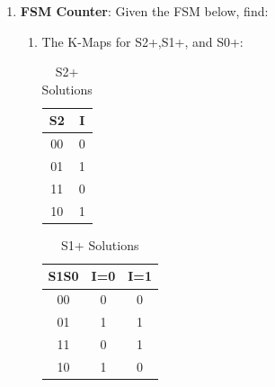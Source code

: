 \documentclass{article}
\begin{document}
\begin{enumerate}[label=(\alph*)]
\begin{multicols}{2}
        \end{multicols}
        \newpage
        \item \textbf{FSM Counter}: Given the FSM below, find:
        \begin{enumerate}[label=(\roman*),nolistsep]
            \item The K-Maps for S2+,S1+, and S0+:
            \newline
\begin{table}[h]
\centering
\begin{tabular}{|c|c|}
\hline
S2 & I \\
\hline
00 & 0 \\
01 & 1 \\
11 & 0 \\
10 & 1 \\
\hline
\end{tabular}
\caption{S2+ Solutions}
\end{table}

\begin{table}[h]
\centering
\begin{tabular}{|c|c|c|}
\hline
S1S0 & I=0 & I=1 \\
\hline
00 & 0 & 0 \\
01 & 1 & 1 \\
11 & 0 & 1 \\
10 & 1 & 0 \\
\hline
\end{tabular}
\caption{S1+ Solutions}
\end{table}


\end{enumerate}
\end{enumerate}
\end{document}
